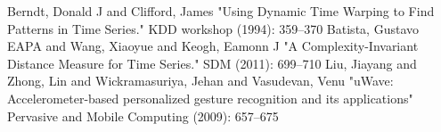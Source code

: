 \begin{thebibliography}{1}
     Berndt, Donald J and Clifford, James "Using Dynamic Time Warping to Find Patterns in
    Time Series." KDD workshop (1994): 359--370
     Batista, Gustavo EAPA and Wang, Xiaoyue and Keogh, Eamonn J "A
    Complexity-Invariant Distance Measure for Time Series." SDM (2011): 699--710
     Liu, Jiayang and Zhong, Lin and Wickramasuriya, Jehan and Vasudevan, Venu "uWave:
    Accelerometer-based personalized gesture recognition and its applications" Pervasive and Mobile Computing
    (2009): 657--675
\end{thebibliography}
